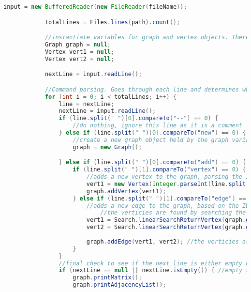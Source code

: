 \documentclass[letterpaper, 10pt,DIV=13]{scrartcl}
\numberwithin{equation}{section} %
\numberwithin{figure}{section} %
\numberwithin{table}{section} %
\begin{document}
\begin{lstlisting}[frame=single, language=java, breaklines]
            input = new BufferedReader(new FileReader(fileName)); 

            totalLines = Files.lines(path).count();

            //instantiate variables for graph and vertex objects. There are two Vertex objects in the case of adding edges.
            Graph graph = null;
            Vertex vert1 = null;
            Vertex vert2 = null;

            nextLine = input.readLine();

            //Command parsing. Goes through each line and determines what command is being used based on strings.
            for (int i = 0; i < totalLines; i++) {
                line = nextLine;
                nextLine = input.readLine();
                if (line.split(" ")[0].compareTo("--") == 0) {
                    //do nothing, ignore this line as it is a comment
                } else if (line.split(" ")[0].compareTo("new") == 0) { //new graph
                    //create a new graph object held by the graph variable
                    graph = new Graph();

                } else if (line.split(" ")[0].compareTo("add") == 0) { //enters add vertex/add edge tree
                    if (line.split(" ")[1].compareTo("vertex") == 0) { //add vertex x
                        //adds a new vertex to the graph, parsing the ID from the line given
                        vert1 = new Vertex(Integer.parseInt(line.split(" ")[2]));
                        graph.addVertex(vert1);
                    } else if (line.split(" ")[1].compareTo("edge") == 0) { //add edge x - y
                        //adds a new edge to the graph, based on the IDs parsed from the line
                            //the verticies are found by searching the graph's verticies ArrayList for a Vertex that matches the ID given in the line at both positions
                        vert1 = Search.linearSearchReturnVertex(graph.getVerticies(), Integer.parseInt(line.split(" ")[2]));
                        vert2 = Search.linearSearchReturnVertex(graph.getVerticies(), Integer.parseInt(line.split(" ")[4]));
                        
                        graph.addEdge(vert1, vert2); //the verticies are now added as neighbors, forming an adjacency
                    }
                }
                //final check to see if the next line is either empty or does not exist 
                if (nextLine == null || nextLine.isEmpty()) { //empty space; commands for this graph are done, begin processing
                    graph.printMatrix();
                    graph.printAdjacencyList();
                    

\end{lstlisting}
\end{document}
